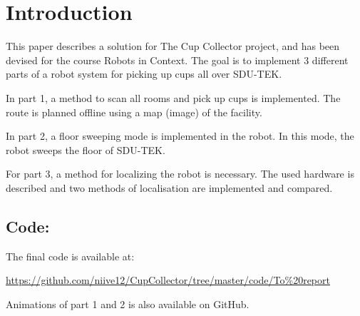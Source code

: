 \section{Introduction}
\label{sec:introduction}
This paper describes a solution for The Cup Collector project,
and has been devised for the course Robots in Context.
The goal is to implement 3 different parts of a robot system for picking up cups all over SDU-TEK. 

In part 1, a method to scan all rooms and pick up cups is implemented.
The route is planned offline using a map (image) of the facility. 

In part 2, a floor sweeping mode is implemented in the robot.
In this mode, the robot sweeps the floor of SDU-TEK.  

For part 3, a method for localizing the robot is necessary.
The used hardware is described and two methods of localisation are implemented and compared.

\subsection{Code:}
The final code is available at: 

\url{https://github.com/niive12/CupCollector/tree/master/code/To\%20report}

Animations of part 1 and 2 is also available on GitHub. 